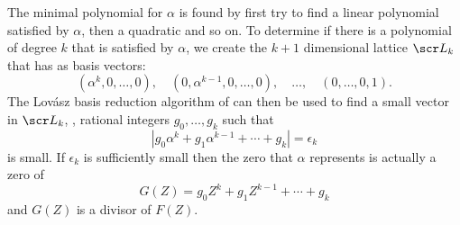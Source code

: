 The minimal polynomial for $\alpha$ is found by first try to find a
linear polynomial satisfied by $\alpha$, then a quadratic and so on.
To determine if there is a polynomial of degree $k$ that is satisfied
by $\alpha$, we create the $k+1$ dimensional lattice ${\scr L}_k$ that
has as basis vectors:
\[
(\alpha^k, 0, \ldots, 0), \quad(0, \alpha^{k-1}, 0, \ldots, 0), 
\quad\ldots, \quad(0, \ldots, 0, 1).
\]
The Lov\'asz basis reduction algorithm of \sectref{} can then be used
to find a small vector in ${\scr L}_k$, \ie, rational integers $g_0,
\ldots, g_k$ such that 
\[
\left|g_0 \alpha^k + g_1 \alpha^{k-1} + \cdots + g_k\right| =
\epsilon_k
\]
is small.  If $\epsilon_k$ is sufficiently small then the zero that
$\alpha$ represents is actually a zero of
\[
G(Z) = g_0 Z^k + g_1 Z^{k-1} + \cdots + g_k
\]
and $G(Z)$ is a divisor of $F(Z)$.


